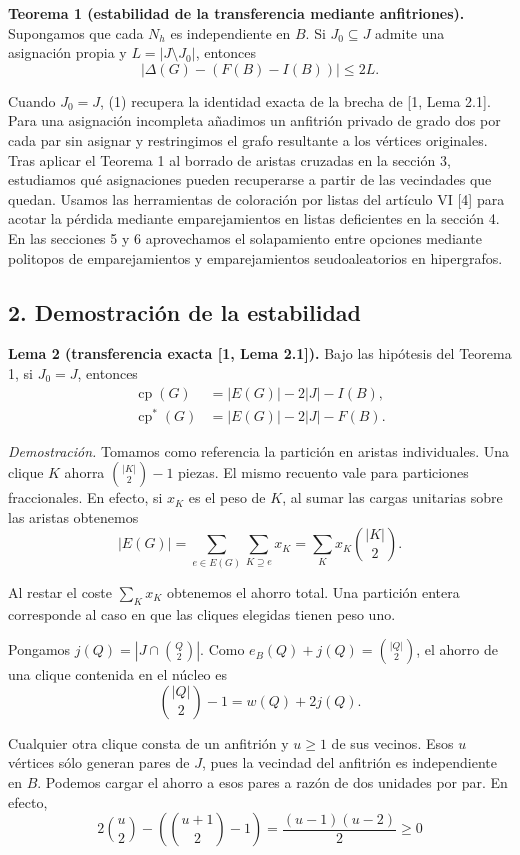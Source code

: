 \documentclass[spanish,11pt,a4paper]{article}
\begin{document}
\textbf{Teorema 1 (estabilidad de la transferencia mediante anfitriones).} Supongamos que cada \(N_h\) es independiente en \(B\). Si \(J_0\subseteq J\) admite una asignación propia y \(L=|J\setminus J_0|\), entonces
\[
\big|\Delta(G)-(F(B)-I(B))\big|\le 2L. \tag{1}
\]

Cuando \(J_0=J\), (1) recupera la identidad exacta de la brecha de {[}1, Lema 2.1{]}. Para una asignación incompleta añadimos un anfitrión privado de grado dos por cada par sin asignar y restringimos el grafo resultante a los vértices originales. Tras aplicar el Teorema 1 al borrado de aristas cruzadas en la sección 3, estudiamos qué asignaciones pueden recuperarse a partir de las vecindades que quedan. Usamos las herramientas de coloración por listas del artículo VI {[}4{]} para acotar la pérdida mediante emparejamientos en listas deficientes en la sección 4. En las secciones 5 y 6 aprovechamos el solapamiento entre opciones mediante politopos de emparejamientos y emparejamientos seudoaleatorios en hipergrafos.

\subsection{2. Demostración de la estabilidad}\label{demostraciuxf3n-de-la-estabilidad}

\textbf{Lema 2 (transferencia exacta {[}1, Lema 2.1{]}).} Bajo las hipótesis del Teorema 1, si \(J_0=J\), entonces
\[
\begin{aligned}
\operatorname{cp}(G)   &= |E(G)|-2|J|-I(B),\\
\operatorname{cp}^{\ast}(G) &= |E(G)|-2|J|-F(B).
\end{aligned} \tag{2}
\]

\emph{Demostración.} Tomamos como referencia la partición en aristas individuales. Una clique \(K\) ahorra \(\binom{|K|}{2}-1\) piezas. El mismo recuento vale para particiones fraccionales. En efecto, si \(x_K\) es el peso de \(K\), al sumar las cargas unitarias sobre las aristas obtenemos
\[
|E(G)|=\sum_{e\in E(G)}\sum_{K\supseteq e}x_K
       =\sum_K x_K\binom{|K|}{2}.
\]

Al restar el coste \(\sum_Kx_K\) obtenemos el ahorro total. Una partición entera corresponde al caso en que las cliques elegidas tienen peso uno.

Pongamos \(j(Q)=|J\cap\binom{Q}{2}|\). Como \(e_B(Q)+j(Q)=\binom{|Q|}{2}\), el ahorro de una clique contenida en el núcleo es
\[
\binom{|Q|}{2}-1=w(Q)+2j(Q). \tag{3}
\]

Cualquier otra clique consta de un anfitrión y \(u\ge1\) de sus vecinos. Esos \(u\) vértices sólo generan pares de \(J\), pues la vecindad del anfitrión es independiente en \(B\). Podemos cargar el ahorro a esos pares a razón de dos unidades por par. En efecto,
\[
2\binom u2-\left(\binom{u+1}{2}-1\right)
=\frac{(u-1)(u-2)}2\ge0
\]
\end{document}
